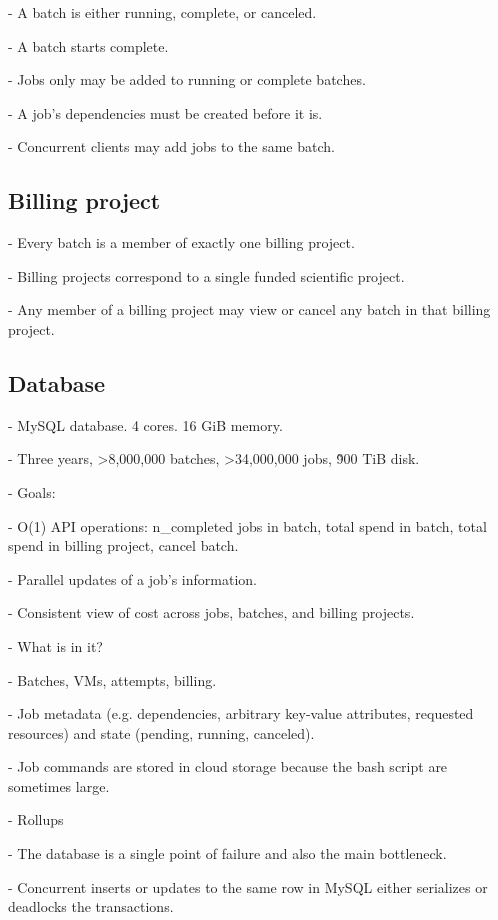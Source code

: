 \documentclass[10pt,a4paper%
]{article}
\begin{document}
    - A batch is either running, complete, or canceled.

    - A batch starts complete.

    - Jobs only may be added to running or complete batches.

    - A job’s dependencies must be created before it is.

    - Concurrent clients may add jobs to the same batch.

\subsection{Billing project}

    - Every batch is a member of exactly one billing project.

    - Billing projects correspond to a single funded scientific project.

    - Any member of a billing project may view or cancel any batch in that billing project.

\subsection{Database}

    - MySQL database. 4 cores. 16 GiB memory.

    - Three years, >8,000,000 batches, >34,000,000 jobs, \~900 TiB disk.

    - Goals:

      - O(1) API operations: n\_completed jobs in batch, total spend in batch, total spend in billing project, cancel batch.

      - Parallel updates of a job’s information.

      - Consistent view of cost across jobs, batches, and billing projects.

    - What is in it?

      - Batches, VMs, attempts, billing.

      - Job metadata (e.g. dependencies, arbitrary key-value attributes, requested resources) and state (pending, running, canceled).

      - Job commands are stored in cloud storage because the bash script are sometimes large.

    - Rollups

      - The database is a single point of failure and also the main bottleneck.

      - Concurrent inserts or updates to the same row in MySQL either serializes or deadlocks the transactions.
\end{document}
